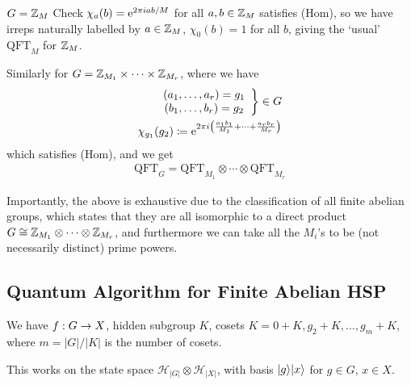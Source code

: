 \documentclass[]{article}
\newcommand{\qft}{\textrm{QFT}}
\begin{document}
\begin{remark*}[Examples] $G = \mathbb{Z}_M$
Check $\chi_a(b) = \mathrm{e}^{2\pi i ab/M}$ for all $a,b\in \mathbb{Z}_M$ satisfies (Hom), so we have irreps naturally labelled by $a\in \mathbb{Z}_M$, $\chi_0(b) = 1$ for all $b$, giving the `usual' $\qft_M$ for $\mathbb{Z}_M$.

Similarly for $G = \mathbb{Z}_{M_1}\times\dots\times\mathbb{Z}_{M_r}$, where we have
\begin{align*}
\left.\begin{array}{c} (a_1,\dots,a_r) = g_1 \\ (b_1,\dots,b_r) = g_2\end{array}\right\rbrace \in G\\
\chi_{g_1}(g_2) \coloneqq \mathrm{e}^{2\pi i\left( \frac{a_1b_1}{M_1}+\dots+\frac{a_rb_r}{M_r}  \right)}
\end{align*}
which satisfies (Hom), and we get
\begin{align*}
\qft_G = \qft_{M_1}\otimes \cdots \otimes \qft_{M_r}
\end{align*}
\end{remark*}

Importantly, the above is exhaustive due to the classification of all finite abelian groups, which states that they are all isomorphic to a direct product $G\cong \mathbb{Z}_{M_1}\otimes\cdots\otimes\mathbb{Z}_{M_r}$, and furthermore we can take all the $M_i$'s to be (not necessarily distinct) prime powers. 

\subsection*{Quantum Algorithm for Finite Abelian HSP}

We have $f: G\rightarrow X$, hidden subgroup $K$, cosets $K = 0 + K, g_2 + K,\dots,g_m+ K$, where $m = |G|/|K|$ is the number of cosets.

This works on the state space $\mathcal{H}_{|G|}\otimes\mathcal{H}_{|X|}$, with basis $\lvert g\rangle\lvert x\rangle$ for $g\in G$, $x\in X$.
\end{document}
